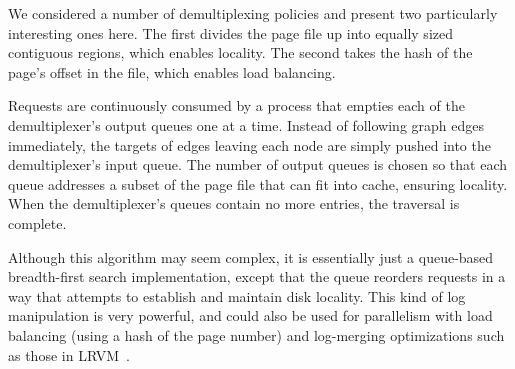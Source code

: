 \documentclass[10pt,letterpaper,twocolumn,english]{article}
\newcommand{\rcs}[1]{\textcolor{green}{\bf RCS: #1}}
\begin{document}
We considered a number of demultiplexing policies and present two
particularly interesting ones here.  The first divides the page file
up into equally sized contiguous regions, which enables locality.  The second takes the hash
of the page's offset in the file, which enables load balancing.

Requests are continuously consumed by a process that empties each of
the demultiplexer's output queues one at a time.  Instead of following
graph edges immediately, the targets of edges leaving each node are
simply pushed into the demultiplexer's input queue.  The number of
 output queues is chosen so that each queue addresses a
subset of the page file that can fit into cache, ensuring locality.  When the
demultiplexer's queues contain no more entries, the traversal is
complete.  

Although this algorithm may seem complex, it is essentially just a
queue-based breadth-first search implementation, except that the queue
reorders requests in a way that attempts to establish and maintain
disk locality.  This kind of log manipulation is very powerful, and
could also be used for parallelism with load balancing (using a hash
of the page number) and log-merging optimizations such as those in
LRVM~\cite{lrvm}.



\end{document}
